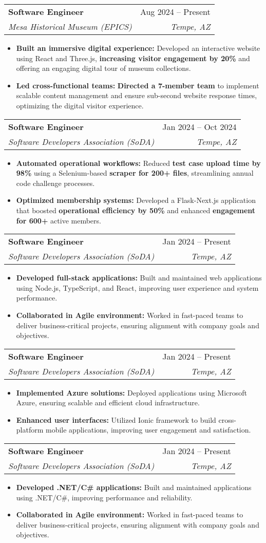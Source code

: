 \documentclass[letterpaper,10pt]{article}
\makeatletter
\newcommand{\resumeItem}[1]{
  \item\small{
    {#1 \vspace{-2pt}}
  }
}
\newcommand{\resumeSubheading}[4]{
  \vspace{-2pt}\item
    \begin{tabular*}{0.97\textwidth}[t]{l@{\extracolsep{\fill}}r}
      \textbf{#1} & #2 \\
      \textit{\small#3} & \textit{\small #4} \\
    \end{tabular*}\vspace{-8pt}
}
\newcommand{\resumeItemListStart}{\begin{itemize}}
\newcommand{\resumeItemListEnd}{\end{itemize}\vspace{-6pt}}
\makeatother
\begin{document}
  \resumeSubheading
      {Software Engineer}{Aug 2024 -- Present}
      {Mesa Historical Museum (EPICS)}{Tempe, AZ}
      \resumeItemListStart
        \resumeItem{\textbf{Built an immersive digital experience:} Developed an interactive website using React and Three.js, \textbf{increasing visitor engagement by 20\%} and offering an engaging digital tour of museum collections.}
        \resumeItem{\textbf{Led cross-functional teams:} \textbf{Directed a 7-member team }to implement scalable content management and ensure sub-second website response times, optimizing the digital visitor experience.}
      \resumeItemListEnd

  \resumeSubheading
      {Software Engineer}{Jan 2024 -- Oct 2024}
      {Software Developers Association (SoDA)}{Tempe, AZ}
      \resumeItemListStart
        \resumeItem{\textbf{Automated operational workflows:} Reduced \textbf{test case upload time by 98\%} using a Selenium-based \textbf{scraper for 200+ files}, streamlining annual code challenge processes.}
        \resumeItem{\textbf{Optimized membership systems:} Developed a Flask-Next.js application that boosted \textbf{operational efficiency by 50\% }and enhanced \textbf{engagement for 600+} active members.}
      \resumeItemListEnd

  \resumeSubheading
      {Software Engineer}{Jan 2024 -- Present}
      {Software Developers Association (SoDA)}{Tempe, AZ}
      \resumeItemListStart
        \resumeItem{\textbf{Developed full-stack applications:} Built and maintained web applications using Node.js, TypeScript, and React, improving user experience and system performance.}
        \resumeItem{\textbf{Collaborated in Agile environment:} Worked in fast-paced teams to deliver business-critical projects, ensuring alignment with company goals and objectives.}
      \resumeItemListEnd

  \resumeSubheading
      {Software Engineer}{Jan 2024 -- Present}
      {Software Developers Association (SoDA)}{Tempe, AZ}
      \resumeItemListStart
        \resumeItem{\textbf{Implemented Azure solutions:} Deployed applications using Microsoft Azure, ensuring scalable and efficient cloud infrastructure.}
        \resumeItem{\textbf{Enhanced user interfaces:} Utilized Ionic framework to build cross-platform mobile applications, improving user engagement and satisfaction.}
      \resumeItemListEnd

  \resumeSubheading
      {Software Engineer}{Jan 2024 -- Present}
      {Software Developers Association (SoDA)}{Tempe, AZ}
      \resumeItemListStart
        \resumeItem{\textbf{Developed .NET/C# applications:} Built and maintained applications using .NET/C#, improving performance and reliability.}
        \resumeItem{\textbf{Collaborated in Agile environment:} Worked in fast-paced teams to deliver business-critical projects, ensuring alignment with company goals and objectives.}
      \resumeItemListEnd
\end{document}
